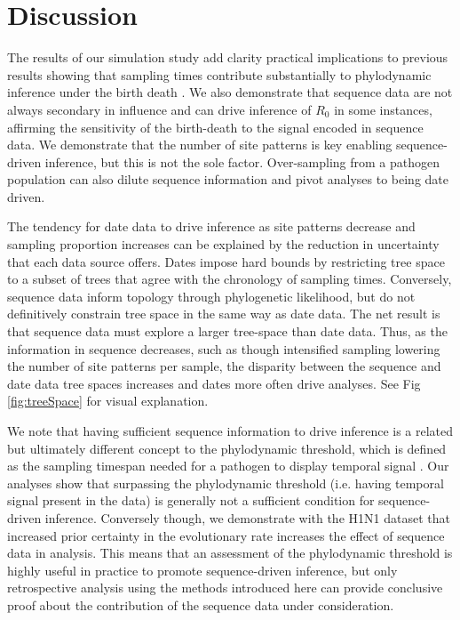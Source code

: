 \documentclass{article}
\begin{document}
\section*{Discussion}
The results of our simulation study add clarity practical implications to previous results showing that sampling times contribute substantially to phylodynamic inference under the birth death \citep{volz_sampling_2014, Featherstone2021Infectious}. We also demonstrate that sequence data are not always secondary in influence and can drive inference of $R_{0}$ in some instances, affirming the sensitivity of the birth-death to the signal encoded in sequence data. We demonstrate that the number of site patterns is key enabling sequence-driven inference, but this is not the sole factor. Over-sampling from a pathogen population can also dilute sequence information and pivot analyses to being date driven.

The tendency for date data to drive inference as site patterns decrease and sampling proportion increases can be explained by the reduction in uncertainty that each data source offers. Dates impose hard bounds by restricting tree space to a subset of trees that agree with the chronology of sampling times. Conversely, sequence data inform topology through phylogenetic likelihood, but do not definitively constrain tree space in the same way as date data. The net result is that sequence data must explore a larger tree-space than date data. Thus, as the information in sequence decreases, such as though intensified sampling lowering the number of site patterns per sample, the disparity between the sequence and date data tree spaces increases and dates more often drive analyses. See Fig \ref{fig:treeSpace} for visual explanation.

We note that having sufficient sequence information to drive inference is a related but ultimately different concept to the phylodynamic threshold, which is defined as the sampling timespan needed for a pathogen to display temporal signal \citep{duchene_temporal_2020}. Our analyses show that surpassing the phylodynamic threshold (i.e. having temporal signal present in the data) is generally not a sufficient condition for sequence-driven inference. Conversely though, we demonstrate with the H1N1 dataset that increased prior certainty in the evolutionary rate increases the effect of sequence data in analysis. This means that an assessment of the phylodynamic threshold is highly useful in practice to promote sequence-driven inference, but only retrospective analysis using the methods introduced here can provide conclusive proof about the contribution of the sequence data under consideration.
\end{document}
